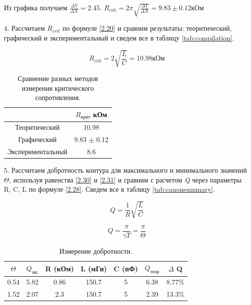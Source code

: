 \documentclass[a4paper,12pt]{article} %
\begin{document}
Из графика получаем $\frac{\Delta Y}{\Delta X} = 2.45$. $ R_\text{crit} = 2\pi\sqrt{\frac{\Delta Y}{\Delta X}} = 9.83 \pm 0.12 \text{кОм} $

4. Рассчитаем $R_{crit}$ по формуле \eqref{2.20} и сравним результаты: теоритический, графический и экспериментальный и сведем все в таблицу \eqref{tab:compilation}.

\begin{equation}
    R_\text{crit} = 2\sqrt{\frac{L}{C}} = 10.98 \text{кОм}
    \label{eq5:ref}
\end{equation}

\begin{table}[H]
\caption{\label{tab:compilation} Сравнение разных методов измерения критического сопротивления.}
\begin{center}
\begin{tabular}{|c|c|}
\hline
& $R_\text{крит}$ кОм\\
\hline
Теоритический & 10.98\\
\hline
Графический & 9.83 $\pm$ 0.12 \\
\hline
Экспериментальный & 8.6\\
\hline
\end{tabular}
\end{center}
\label{table3:ref}
\end{table}

5. Рассчитаем добротность контура для максимального и минимального значений $\Theta$, используя равенства \eqref{2.30} и \eqref{2.31} и сравним с расчетом \textit{Q} через параметры R, C, L по формуле \eqref{2.28}. Сведем все в таблицу \eqref{tab:canonsummary}.

\begin{equation}\label{2.28}
Q = \frac{1}{R} \sqrt{\frac{L}{C}}
\end{equation}

\begin{equation}\label{2.31}
Q = \frac{\pi}{\gamma T} = \frac{\pi}{\Theta}
\end{equation}

\begin{table}[H]
\caption{\label{tab:canonsummary} Измерение добротности.}
\begin{center}
\begin{tabular}{|c|c|c|c|c|c|c|}
\hline
$\Theta$ & $Q_\text{экс}$ & R (кОм) & L (мГн) & C (пФ) & $Q_\text{теор}$ & $\Delta$ Q\\
\hline
0.54 & 5.82 & 0.86 & 150.7 & 5 & 6.38 & 8.77\%\\
\hline
1.52 & 2.07 & 2.3 & 150.7 & 5 & 2.39 & 13.3\%\\
\hline
\end{tabular}
\end{center}
\label{table4:ref}
\end{table}
\end{document}
